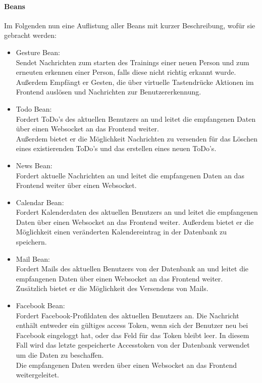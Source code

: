 \documentclass[10pt,a4paper]{report}
\begin{document}
        \paragraph{Beans}
        Im Folgenden nun eine Auflistung aller Beans mit kurzer Beschreibung,
        wofür sie gebracht werden:
        \begin{itemize}
        \item Gesture Bean: \\
            Sendet Nachrichten zum starten des Trainings einer neuen Person und zum erneuten erkennen einer Person, falls diese nicht richtig erkannt wurde.\\
            Außerdem Empfängt er Gesten, die über virtuelle Tastendrücke Aktionen im Frontend auslösen und Nachrichten zur Benutzererkennung.
        \item Todo Bean: \\
            Fordert ToDo's des aktuellen Benutzers an und leitet die empfangenen Daten über einen Websocket an das Frontend weiter.\\
            Außerdem bietet er die Möglichkeit Nachrichten zu versenden für das Löschen eines existierenden ToDo's und das erstellen eines neuen ToDo's.
        \item News Bean: \\
            Fordert aktuelle Nachrichten an und leitet die empfangenen Daten an das Frontend weiter über einen Websocket.
        \item Calendar Bean: \\
            Fordert Kalenderdaten des aktuellen Benutzers an und leitet die empfangenen Daten über einen Websocket an das Frontend weiter. Außerdem bietet er die Möglichkeit einen veränderten Kalendereintrag in der Datenbank zu speichern.
        \item Mail Bean: \\
            Fordert Mails des aktuellen Benutzers von der Datenbank an und leitet die empfangenen Daten über einen Websocket an das Frontend weiter.\\
            Zusätzlich bietet er die Möglichkeit des Versendens von Mails.
        \item Facebook Bean: \\
            Fordert Facebook-Profildaten des aktuellen Benutzers an. Die Nachricht enthält entweder ein gültiges access Token, wenn sich der Benutzer neu bei Facebook eingeloggt hat, oder das Feld für das Token bleibt leer. In diesem Fall wird das letzte gespeicherte Accesstoken von der Datenbank verwendet um die Daten zu beschaffen. \\
            Die empfangenen Daten werden über einen Websocket an das Frontend weitergeleitet.
        \end{itemize}
\end{document}
